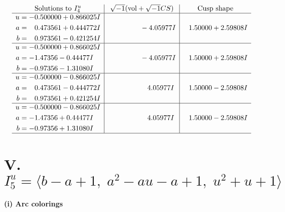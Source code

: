 \documentclass[1p]{elsarticle_modified}
\theoremstyle{definition}
\newcommand{\I}{\sqrt{-1}}
\begin{document}
$$\begin{array}{c|c|c}  
\text{Solutions to }I^u_{4}& \I (\text{vol} + \sqrt{-1}CS) & \text{Cusp shape}\\
 \hline 
\begin{aligned}
u &= -0.500000 + 0.866025 I \\
a &= \phantom{-}0.473561 + 0.444772 I \\
b &= \phantom{-}0.973561 - 0.421254 I\end{aligned}
 & \phantom{-0.000000 } -4.05977 I & \phantom{-}1.50000 + 2.59808 I \\ \hline\begin{aligned}
u &= -0.500000 + 0.866025 I \\
a &= -1.47356 - 0.44477 I \\
b &= -0.97356 - 1.31080 I\end{aligned}
 & \phantom{-0.000000 } -4.05977 I & \phantom{-}1.50000 + 2.59808 I \\ \hline\begin{aligned}
u &= -0.500000 - 0.866025 I \\
a &= \phantom{-}0.473561 - 0.444772 I \\
b &= \phantom{-}0.973561 + 0.421254 I\end{aligned}
 & \phantom{-0.000000 -}4.05977 I & \phantom{-}1.50000 - 2.59808 I \\ \hline\begin{aligned}
u &= -0.500000 - 0.866025 I \\
a &= -1.47356 + 0.44477 I \\
b &= -0.97356 + 1.31080 I\end{aligned}
 & \phantom{-0.000000 -}4.05977 I & \phantom{-}1.50000 - 2.59808 I\\
 \hline 
 \end{array}$$\newpage\newpage\renewcommand{\arraystretch}{1}
\centering \section*{V. $I^u_{5}= \langle b- a+1,\;a^2- a u- a+1,\;u^2+u+1 \rangle$}
\flushleft \textbf{(i) Arc colorings}\\
\end{document}
